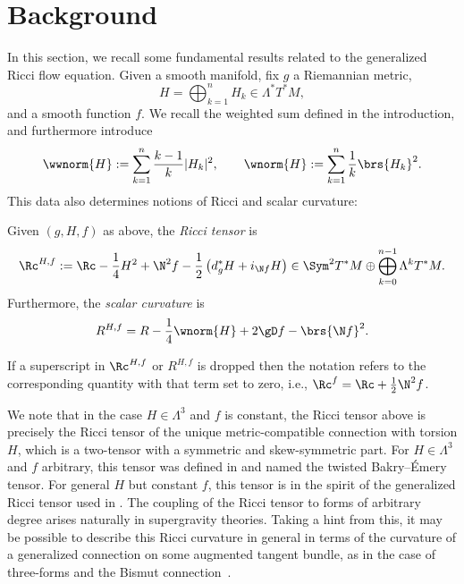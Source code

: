 \section{Background}

In this section, we recall some fundamental results related to the generalized Ricci flow equation. Given a smooth manifold, fix $g$ a Riemannian metric, \[H = \bigoplus_{k=1}^n H_k \in \Lambda^* T^* M,\] and a smooth function $f$. We recall the weighted sum defined in the introduction, and furthermore introduce
\begin{align*}
 \wwnorm{H}:= \sum_{k=1}^n\frac{k-1}k|H_k|^2, \qquad \wnorm{H} := \sum_{k=1}^n \frac{1}{k} \brs{H_k}^2.
\end{align*}
This data also determines notions of Ricci and scalar curvature:
\begin{defn} Given $(g, H, f)$ as above, the \emph{Ricci tensor} is
\begin{align*}
 \Rc^{H,f} := \Rc - \frac{1}{4} H^2 + \N^2 f - \frac{1}{2} \left( d^*_g H + i_{\N f} H \right) \in \Sym^2 T^* M \oplus \bigoplus_{k=0}^{n-1} \Lambda^k T^* M.
\end{align*}
Furthermore, the \emph{scalar curvature} is
\begin{align*}
 R^{H,f} = R - \frac{1}{4} \wnorm{H} + 2 \gD f - \brs{\N f}^2.
\end{align*}
\end{defn}

\begin{rmk} If a superscript in $\Rc^{H,f}$ or $R^{H,f}$ is dropped then the notation refers to the corresponding quantity with that term set to zero, i.e., $\Rc^f = \Rc + \frac{1}{2} \N^2 f$.
\end{rmk}

We note that in the case $H \in \Lambda^3$ and $f$ is constant, the Ricci tensor above is precisely the Ricci tensor of the unique metric-compatible connection with torsion $H$, which is a two-tensor with a symmetric and skew-symmetric part. For $H \in \Lambda^3$ and $f$ arbitrary, this tensor was defined in \cite{Streetsscalar} and named the twisted Bakry--\'Emery tensor. For general $H$ but constant $f$, this tensor is in the spirit of the generalized Ricci tensor used in \cite{FNS}. The coupling of the Ricci tensor to forms of arbitrary degree arises naturally in supergravity theories. Taking a hint from this, it may be possible to describe this Ricci curvature in general in terms of the curvature of a generalized connection on some augmented tangent bundle, as in the case of three-forms and the Bismut connection~\cite{GRFbook}.

